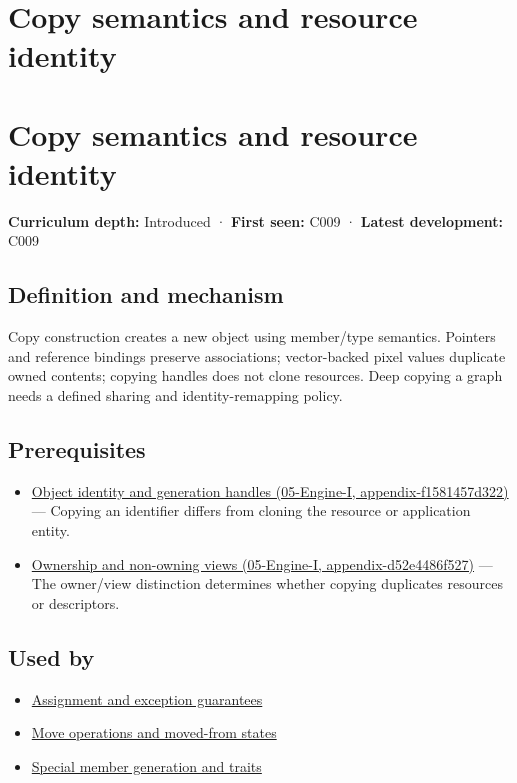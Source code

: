 \hypertarget{appendix-1340cd1ce582}{}
\section*{Copy semantics and resource identity}
\section{Copy semantics and resource identity}\label{copy-semantics-and-resource-identity}

\textbf{Curriculum depth:} Introduced · \textbf{First seen:} C009 · \textbf{Latest development:} C009

\subsection{Definition and mechanism}\label{definition-and-mechanism}

Copy construction creates a new object using member/type semantics. Pointers and reference bindings preserve associations; vector-backed pixel values duplicate owned contents; copying handles does not clone resources. Deep copying a graph needs a defined sharing and identity-remapping policy.

\subsection{Prerequisites}\label{prerequisites}

\begin{itemize}
\tightlist
\item
  \href{}{Object identity and generation handles (05-Engine-I, appendix-f1581457d322)} --- Copying an identifier differs from cloning the resource or application entity.
\item
  \href{}{Ownership and non-owning views (05-Engine-I, appendix-d52e4486f527)} --- The owner/view distinction determines whether copying duplicates resources or descriptors.
\end{itemize}

\subsection{Used by}\label{used-by}

\begin{itemize}
\tightlist
\item
  \hyperref[appendix-bea6beb5350f]{Assignment and exception guarantees}
\item
  \hyperref[appendix-5636651017c2]{Move operations and moved-from states}
\item
  \hyperref[appendix-42e02a12c694]{Special member generation and traits}
\end{itemize}

